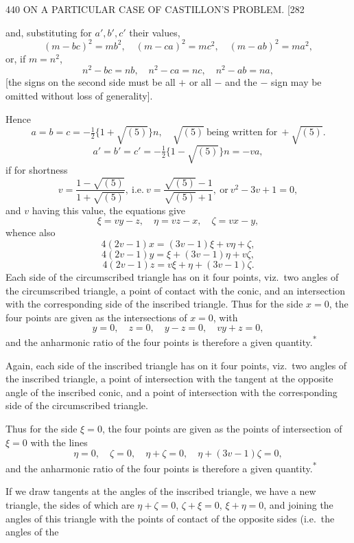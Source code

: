 \documentclass[11pt]{article}
\begin{document}
\begin{center}
440 \hfill ON A PARTICULAR CASE OF CASTILLON'S PROBLEM. \hfill \textsc{[282}
\end{center}

and, substituting for $a',b',c'$ their values,
\[ (m-bc)^{2}=mb^{2},\quad (m-ca)^{2}=mc^{2},\quad (m-ab)^{2}=ma^{2}, \]
or, if $m=n^{2}$,
\[ n^{2}-bc=nb,\quad n^{2}-ca=nc,\quad n^{2}-ab=na, \]
[the signs on the second side must be all $+$ or all $-$ and the $-$ sign may be
omitted without loss of generality].

Hence
\[ a=b=c=-\tfrac{1}{2}\{1+\sqrt{(5)}\}n,\quad \sqrt{(5)}\ \text{being written for}\ +\sqrt{(5)}. \]
\[ a'=b'=c'=-\tfrac{1}{2}\{1-\sqrt{(5)}\}n=-va, \]
if for shortness
\[ v=\dfrac{1-\sqrt{(5)}}{1+\sqrt{(5)}},\ \text{i.e.}\ v=\dfrac{\sqrt{(5)}-1}{\sqrt{(5)}+1},\ \text{or}\ v^{2}-3v+1=0, \]
and $v$ having this value, the equations give
\[ \xi=vy-z,\quad \eta=vz-x,\quad \zeta=vx-y, \]
whence also
\[ 4(2v-1)x=(3v-1)\xi+v\eta+\zeta, \]
\[ 4(2v-1)y=\xi+(3v-1)\eta+v\zeta, \]
\[ 4(2v-1)z=v\xi+\eta+(3v-1)\zeta. \]
Each side of the circumscribed triangle has on it four points, viz.\ two angles of the
circumscribed triangle, a point of contact with the conic, and an intersection with
the corresponding side of the inscribed triangle. Thus for the side $x=0$, the four
points are given as the intersections of $x=0$, with
\[ y=0,\quad z=0,\quad y-z=0,\quad vy+z=0, \]
and the anharmonic ratio of the four points is therefore a given quantity.\textsuperscript{*}

Again, each side of the inscribed triangle has on it four points, viz.\ two angles
of the inscribed triangle, a point of intersection with the tangent at the opposite
angle of the inscribed conic, and a point of intersection with the corresponding side
of the circumscribed triangle.

Thus for the side $\xi=0$, the four points are given as the points of intersection
of $\xi=0$ with the lines
\[ \eta=0,\quad \zeta=0,\quad \eta+\zeta=0,\quad \eta+(3v-1)\zeta=0, \]
and the anharmonic ratio of the four points is therefore a given quantity.\textsuperscript{*}

If we draw tangents at the angles of the inscribed triangle, we have a new triangle,
the sides of which are $\eta+\zeta=0$, $\zeta+\xi=0$, $\xi+\eta=0$, and joining the
angles of this triangle with the points of contact of the opposite sides (i.e.\ the
angles of the
\end{document}
